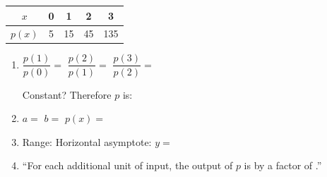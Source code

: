 \documentclass[10pt]{article}
\begin{document}
\vspace{0.08in}

\begin{tcolorbox}[colback=white, colframe=black!40,
    title=\textbf{Tier A --- Apply (Key)},
    fonttitle=\bfseries, arc=2mm, left=3mm, right=3mm, top=2mm, bottom=2mm]

\renewcommand{\arraystretch}{1.4}
\begin{tabular}{|c|c|c|c|c|}
\hline
$x$    & 0 & 1  & 2  & 3   \\
\hline
$p(x)$ & 5 & 15 & 45 & 135 \\
\hline
\end{tabular}

\begin{enumerate}[itemsep=8pt]
  \item $\dfrac{p(1)}{p(0)} = $  \quad
        $\dfrac{p(2)}{p(1)} = $  \quad
        $\dfrac{p(3)}{p(2)} = $ 

        Constant?  \quad Therefore $p$ is: 

  \item $a = $  \quad $b = $  \quad $p(x) = $ 

  \item Range:  \quad Horizontal asymptote: $y = $ 

  \item ``For each additional unit of input, the output of $p$ is  by a factor
        of .''
\end{enumerate}
\end{tcolorbox}

\vspace{0.08in}
\end{document}
